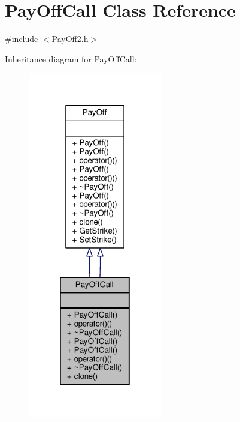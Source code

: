 \hypertarget{classPayOffCall}{}\section{Pay\+Off\+Call Class Reference}
\label{classPayOffCall}


{\ttfamily \#include $<$Pay\+Off2.\+h$>$}



Inheritance diagram for Pay\+Off\+Call\+:
\nopagebreak
\begin{figure}[H]
\begin{center}
\leavevmode
\includegraphics[width=166pt]{classPayOffCall__inherit__graph}
\end{center}
\end{figure}



